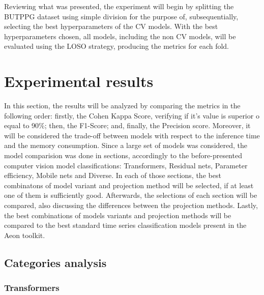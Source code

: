 Reviewing what was presented, the experiment will begin by splitting the \acrshort{BUTPPG} dataset using simple division for the purpose of, subsequentially, selecting the best hyperparameters of the \acrshort{CV} models. With the best hyperparameters chosen, all models, including the non \acrshort{CV} models, will be evaluated using the \acrshort{LOSO} strategy, producing the metrics for each fold.


\section{Experimental results}


In this section, the results will be analyzed by comparing the metrics in the following order: firstly, the Cohen Kappa Score, verifying if it's value is superior o equal to 90\%; then, the F1-Score; and, finally, the Precision score. Moreover, it will be considered the trade-off between models with respect to the inference time and the memory consumption. Since a large set of models was considered, the model comparision was done in sections, accordingly to the before-presented computer vision model classifications: Transformers, Residual nets, Parameter efficiency, Mobile nets and Diverse. In each of those sections, the best combinatons of model variant and projection method will be selected, if at least one of them is sufficiently good. Afterwards, the selections of each section will be compared, also discussing the differences between the projection methods. Lastly, the best combinations of models variants and projection methods will be compared to the best standard time series classification models present in the Aeon toolkit.

\pagebreak

\subsection{Categories analysis}

\subsubsection{Transformers}

